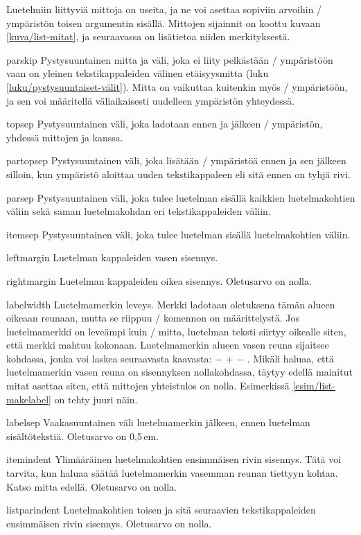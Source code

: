 Luetelmiin liittyviä mittoja on useita, ja ne voi asettaa sopiviin
arvoihin \-/ ympäristön toisen argumentin sisällä.
Mittojen sijainnit on koottu kuvaan \ref{kuva/list-mitat}, ja
seuraavassa on lisätietoa niiden merkityksestä.

\begin{maaritelma}{}
\item [parskip] Pystysuuntainen mitta ja väli, joka ei liity pelkästään
  \-/ ympäristöön vaan on yleinen tekstikappaleiden
  välinen etäisyysmitta (luku \ref{luku/pystysuuntaiset-välit}). Mitta
  on vaikuttaa kuitenkin myös \-/ ympäristöön, ja sen
  voi määritellä väliaikaisesti uudelleen ympäristön yhteydessä.
\item [topsep] Pystysuuntainen väli, joka ladotaan ennen ja jälkeen
  \-/ ympäristön, yhdessä mittojen  ja
   kanssa.
\item [partopsep] Pystysuuntainen väli, joka lisätään
  \-/ ympäristöä ennen ja sen jälkeen silloin, kun
  ympäristö aloittaa uuden tekstikappaleen eli sitä ennen on tyhjä rivi.
\item [parsep] Pystysuuntainen väli, joka tulee luetelman sisällä
  kaikkien luetelmakohtien väliin sekä saman luetelmakohdan eri
  tekstikappaleiden väliin.
\item [itemsep] Pystysuuntainen väli, joka tulee luetelman sisällä
  luetelmakohtien väliin.
\item [leftmargin] Luetelman kappaleiden vasen sisennys.
\item [rightmargin] Luetelman kappaleiden oikea sisennys. Oletusarvo on
  nolla.
\item [labelwidth] Luetelmamerkin leveys. Merkki ladotaan oletuksena
  tämän alueen oikeaan reunaan, mutta se riippuu \-/
  komennon on määrittelystä. Jos luetelmamerkki on leveämpi kuin
  \-/ mitta, luetelman teksti siirtyy oikealle siten,
  että merkki mahtuu kokonaan. Luetelmamerkin alueen vasen reuna
  sijaitsee kohdassa, jonka voi laskea seuraavasta kaavasta:
   −  +  −
  . Mikäli haluaa, että luetelmamerkin vasen reuna on
  sisennyksen nollakohdassa, täytyy edellä mainitut mitat asettaa siten,
  että mittojen yhteistulos on nolla. Esimerkissä
  \ref{esim/list-makelabel} on tehty juuri näin.
\item [labelsep] Vaakasuuntainen väli luetelmamerkin jälkeen, ennen
  luetelman sisältötekstiä. Oletusarvo on 0,5\,em.
\item [itemindent] Ylimääräinen luetelmakohtien ensimmäisen rivin
  sisennys. Tätä voi tarvita, kun haluaa säätää luetelmamerkin vasemman
  reunan tiettyyn kohtaa. Katso mitta  edellä.
  Oletusarvo on nolla.
\item [listparindent] Luetelmakohtien toisen ja sitä seuraavien
  tekstikappaleiden ensimmäisen rivin sisennys. Oletusarvo on nolla.
\end{maaritelma}

